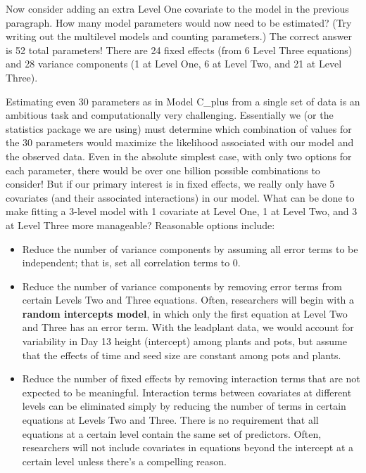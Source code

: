 \documentclass[
]{krantz}
\providecommand{\tightlist}{%
  \setlength{\itemsep}{0pt}\setlength{\parskip}{0pt}}
\begin{document}
Now consider adding an extra Level One covariate to the model in the previous paragraph. How many model parameters would now need to be estimated? (Try writing out the multilevel models and counting parameters.) The correct answer is 52 total parameters! There are 24 fixed effects (from 6 Level Three equations) and 28 variance components (1 at Level One, 6 at Level Two, and 21 at Level Three).

Estimating even 30 parameters as in Model C\_plus from a single set of data is an ambitious task and computationally very challenging. Essentially we (or the statistics package we are using) must determine which combination of values for the 30 parameters would maximize the likelihood associated with our model and the observed data. Even in the absolute simplest case, with only two options for each parameter, there would be over one billion possible combinations to consider! But if our primary interest is in fixed effects, we really only have 5 covariates (and their associated interactions) in our model. What can be done to make fitting a 3-level model with 1 covariate at Level One, 1 at Level Two, and 3 at Level Three more manageable? Reasonable options include:

\begin{itemize}
\tightlist
\item
  Reduce the number of variance components by assuming all error terms to be independent; that is, set all correlation terms to 0.
\item
  Reduce the number of variance components by removing error terms from certain Levels Two and Three equations. Often, researchers will begin with a \textbf{random intercepts model},  in which only the first equation at Level Two and Three has an error term. With the leadplant data, we would account for variability in Day 13 height (intercept) among plants and pots, but assume that the effects of time and seed size are constant among pots and plants.
\item
  Reduce the number of fixed effects by removing interaction terms that are not expected to be meaningful. Interaction terms between covariates at different levels can be eliminated simply by reducing the number of terms in certain equations at Levels Two and Three. There is no requirement that all equations at a certain level contain the same set of predictors. Often, researchers will not include covariates in equations beyond the intercept at a certain level unless there's a compelling reason.
\end{itemize}
\end{document}
